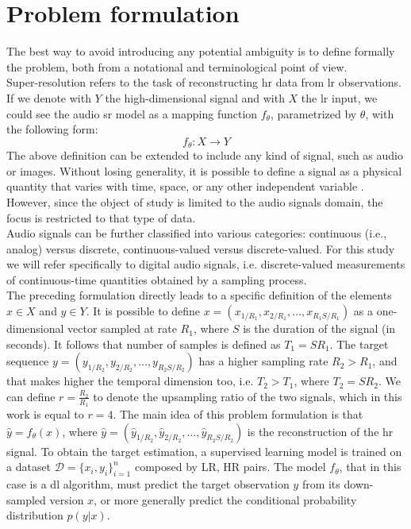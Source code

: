 \section{Problem formulation} \label{problem_formulation}
The best way to avoid introducing any potential ambiguity is to define formally the problem, both from a notational and terminological point of view. \\
Super-resolution refers to the task of reconstructing \gls{hr} data from \gls{lr} observations. If we denote with $Y$ the high-dimensional signal and with $X$ the \gls{lr} input, we could see the audio \gls{sr} model as a mapping function $f_{\theta}$, parametrized by $\theta$, with the following form:
$$
f_{\theta}: X \rightarrow Y
$$
The above definition can be extended to include any kind of signal, such as audio or images. Without losing generality, it is possible to define a signal as a physical quantity that varies with time, space, or any other independent variable \cite{proakis2006dimitris}. However, since the object of study is limited to the audio signals domain, the focus is restricted to that type of data. \\
Audio signals can be further classified into various categories: continuous (i.e., analog) versus discrete, continuous-valued versus discrete-valued. For this study we will refer specifically to digital audio signals, i.e. discrete-valued measurements of continuous-time quantities obtained by a sampling process. \\
The preceding formulation directly leads to a specific definition of the elements $x \in X$ and $y \in Y$. It is possible to define $x = (x_{1/R_1}, x_{2/R_1}, \dots, x_{R_1S/R_1})$ as a one-dimensional vector sampled at rate $R_1$, where $S$ is the duration of the signal (in seconds). It follows that number of samples is defined as $T_1 = SR_1$. The target sequence $y = (y_{1/R_2}, y_{2/R_2}, \dots, y_{R_2S/R_2})$ has a higher sampling rate $R_2 > R_1$, and that makes higher the temporal dimension too, i.e. $T_2 > T_1$, where $T_2 = SR_2$. We can define $r = \frac{R_2}{R_1}$ to denote the upsampling ratio of the two signals, which in this work is equal to $r = 4$. The main idea of this problem formulation is that $\hat{y} = f_{\theta}(x)$, where $\hat{y} = (\hat{y}_{1/R_2}, \hat{y}_{2/R_2}, \dots, \hat{y}_{R_2S/R_2})$ is the reconstruction of the \gls{hr} signal. To obtain the target estimation, a supervised learning model is trained on a dataset $\mathcal{D} = \{x_i, y_i\}_{i = 1}^n$ composed by LR, HR pairs. The model $f_{\theta}$, that in this case is a \gls{dl} algorithm, must predict the target observation $y$ from its down-sampled version $x$, or more generally predict the conditional probability distribution $p(y|x)$. \\

